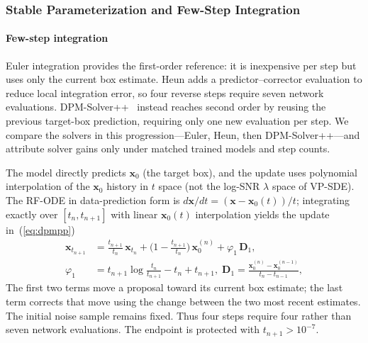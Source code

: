 \documentclass[journal,10pt]{IEEEtran}
\theoremstyle{definition}
\begin{document}
\subsubsection{Stable Parameterization and Few-Step Integration}\label{sec:method-solver}

\paragraph{Few-step integration}
Euler integration provides the first-order reference: it is inexpensive per
step but uses only the current box estimate. Heun adds a predictor--corrector
evaluation to reduce local integration error, so four reverse steps require
seven network evaluations. DPM-Solver++~\cite{lu2022dpmpp} instead reaches
second order by reusing the previous target-box prediction, requiring only one
new evaluation per step. We compare the solvers in this progression---Euler,
Heun, then DPM-Solver++---and attribute solver gains only under matched
trained models and step counts.

The model directly predicts $\mathbf{x}_0$ (the target box), and the update uses polynomial
interpolation of the $\mathbf{x}_0$ history in $t$ space (not the log-SNR
$\lambda$ space of VP-SDE). The RF-ODE in data-prediction form is
$d\mathbf{x}/dt = (\mathbf{x} - \mathbf{x}_0(t))/t$; integrating exactly over
$[t_n, t_{n+1}]$ with linear $\mathbf{x}_0(t)$ interpolation yields the update in~(\ref{eq:dpmpp})
\begin{equation}\label{eq:dpmpp}
\begin{aligned}
  \mathbf{x}_{t_{n+1}} &= \tfrac{t_{n+1}}{t_n}\,\mathbf{x}_{t_n}
    + \bigl(1 - \tfrac{t_{n+1}}{t_n}\bigr)\,\mathbf{x}_0^{(n)}
    + \varphi_1\,\mathbf{D}_1, \\
  \varphi_1 &= t_{n+1}\log\tfrac{t_n}{t_{n+1}} - t_n + t_{n+1},\;
  \mathbf{D}_1 = \tfrac{\mathbf{x}_0^{(n)} - \mathbf{x}_0^{(n-1)}}{t_n - t_{n-1}},
\end{aligned}
\end{equation}
The first two terms move a proposal toward its current box estimate; the last
term corrects that move using the change between the two most recent estimates.
The initial noise sample remains fixed. Thus four steps require four rather
than seven network evaluations. The endpoint is protected with
$t_{n+1}>10^{-7}$.
\end{document}
